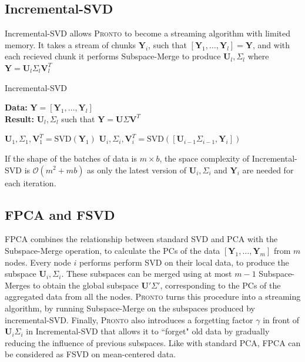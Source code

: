 \subsection{Incremental-SVD}
Incremental-SVD allows \textsc{Pronto} to become a streaming algorithm with limited
memory. It takes a stream of chunks $\mathbf{Y}_i$, such that  $[\mathbf{Y}_1,
\ldots, \mathbf{Y}_l] = \mathbf{Y}$, and with each recieved chunk it performs
Subspace-Merge to produce $\mathbf{U}_l, \Sigma_l$ where $\mathbf{Y} =
\mathbf{U}_l\Sigma_l\mathbf{V}_l^T$

\begin{algorithm}
\caption{Incremental-SVD}
\textbf{Data:} $\mathbf{Y} = [\mathbf{Y}_1, \dots, \mathbf{Y}_l]$ \\
    \textbf{Result:} $\mathbf{U}_l, \Sigma_l$ such that $\mathbf{Y} =
    \mathbf{U}\Sigma\mathbf{V}^T$
\begin{algorithmic}
\State $\mathbf{U}_1, \Sigma_1, \mathbf{V}_1^T = \text{SVD}(\mathbf{Y}_1)$
\State $\mathbf{U}_i, \Sigma_i, \mathbf{V}_i^T = \text{SVD}([\mathbf{U}_{i-1}\Sigma_{i-1}, \mathbf{Y}_i])$
\EndFor
\end{algorithmic}
\end{algorithm}
If the shape of the batches of data is $m \times b$, the space complexity of
Incremental-SVD is $\mathcal{O}(m^2 + mb)$ as only the latest version of
$\mathbf{U}_i,\Sigma_i$ and $\mathbf{Y}_i$ are needed for each iteration.

\subsection{FPCA and FSVD}
FPCA combines the relationship between standard SVD and PCA with the
Subspace-Merge operation, to calculate the PCs of the data $[\mathbf{Y}_1,
\ldots,\mathbf{Y}_m]$ from $m$ nodes. Every node $i$ performs perform SVD  on
their local data, to produce the subspace $\mathbf{U}_i, \Sigma_i$. These
subspaces can be merged using at most $m-1$ Subspace-Merges to obtain the global
subspace $\mathbf{U}'\Sigma'$, corresponding to the PCs of the aggregated data
from all the nodes. \textsc{Pronto} turns this procedure into a streaming algorithm, by
running Subspace-Merge on the subspaces produced by incremental-SVD. Finally,
\textsc{Pronto} also introduces a forgetting factor $\gamma$ in front of
$\mathbf{U}_i\Sigma_i$ in Incremental-SVD that allows it to ``forget" old data
by gradually reducing the influence of previous subspaces. Like with standard
PCA, FPCA can be considered as FSVD on mean-centered data.

